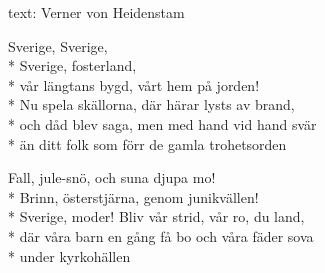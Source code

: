\begin{SongText}[Sverige]
    \begin{SongInfo}
        text: Verner von Heidenstam
    \end{SongInfo}
    \begin{SongVerse}
        Sverige, Sverige,\\*%
        Sverige, fosterland,\\*%
        vår längtans bygd, vårt hem på jorden!\\*%
        Nu spela skällorna, där härar lysts av brand,\\*%
        och dåd blev saga, men med hand vid hand svär\\*%
        än ditt folk som förr de gamla trohetsorden
    \end{SongVerse}
    \begin{SongVerse}
        Fall, jule-snö, och suna djupa mo!\\*%
        Brinn, österstjärna, genom junikvällen!\\*%
        Sverige, moder! Bliv vår strid, vår ro, du land,\\*%
        där våra barn en gång få bo och våra fäder sova\\*%
        under kyrkohällen
    \end{SongVerse}
\end{SongText}

